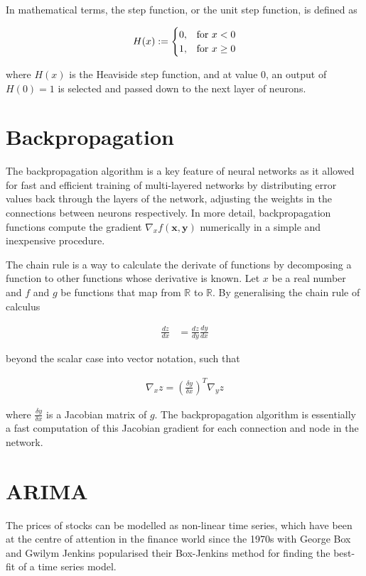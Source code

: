 In mathematical terms, the step function, or the unit step function, is defined as

\begin{align}
    \centering
    H(x) := \begin{cases}
        0, & \text{for } x < 0 \\
        1, & \text{for } x \geq 0
    \end{cases}
\end{align}

where $H(x)$ is the Heaviside step function\cite{step_function}, and at value 0, an output of $H(0) = 1$ is selected and passed down to the next layer of neurons.

\section{Backpropagation}
The backpropagation algorithm is a key feature of neural networks as it allowed for fast and efficient training of multi-layered networks by distributing error values back through the layers of the network, adjusting the weights in the connections between neurons respectively\cite{backprop}. In more detail, backpropagation functions compute the gradient $\nabla_{x}f(\mathbf{x}, \mathbf{y})$ numerically in a simple and inexpensive procedure\cite{rumelhart_backprop}.

\newcommand{\R}{\mathbb{R}}

The chain rule is a way to calculate the derivate of functions by decomposing a function to other functions whose derivative is known. Let $x$ be a real number and $f$ and $g$ be functions that map from $\R$ to $\R$. By generalising the chain rule of calculus

\begin{align}
    \frac{dz}{dx} &= \frac{dz}{dy}\frac{dy}{dx}
\end{align}

beyond the scalar case into vector notation, such that 

\begin{align}
    \nabla_{x}z = (\frac{\delta y}{\delta x})^T \nabla_{y}z
\end{align}

where $\frac{\delta y}{\delta x}$ is a Jacobian matrix of $g$. The backpropagation algorithm is essentially a fast computation of this Jacobian gradient for each connection and node in the network\cite{goodfellow_backprop}.

\section{ARIMA}
The prices of stocks can be modelled as non-linear time series, which have been at the centre of attention in the finance world since the 1970s with George Box and Gwilym Jenkins popularised their Box-Jenkins method for finding the best-fit of a time series model\cite{box_jenkins}.

